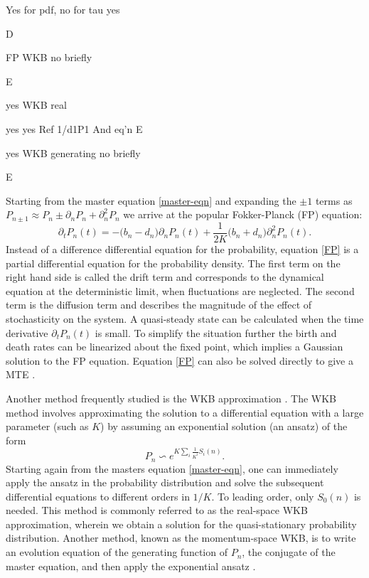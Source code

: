 Yes for pdf, no for tau
yes


D




FP WKB
no
briefly


E


yes
WKB real


yes
yes
Ref 1/d1P1
And eq’n
E


yes
WKB generating
no
briefly


E




\fi
Starting from the master equation \ref{master-eqn} and expanding the $\pm 1$ terms as $P_{n\pm 1} \approx P_n \pm \partial_n P_n + \partial^2_n P_n$ we arrive at the popular Fokker-Planck (FP) equation:
\begin{equation}
\partial_t P_n(t) = - \Big( b_n - d_n \Big) \partial_n P_n(t) + \frac{1}{2 K} \Big( b_n + d_n \Big) \partial_n^2 P_n(t).  \label{FP}
\end{equation}
Instead of a difference differential equation for the probability, equation \ref{FP} is a partial differential equation for the probability density.
The first term on the right hand side is called the drift term and corresponds to the dynamical equation at the deterministic limit, when fluctuations are neglected.
The second term is the diffusion term and describes the magnitude of the effect of stochasticity on the system.
A quasi-steady state can be calculated when the time derivative $\partial_t P_n(t)$ is small.
To simplify the situation further the birth and death rates can be linearized about the fixed point, which implies a Gaussian solution to the FP equation.
Equation \ref{FP} can also be solved directly to give a MTE \cite{Gardiner2004}.

Another method frequently studied is the WKB approximation \cite{Doering2005,Assaf2006,Kessler2007,Ovaskainen2010,Assaf2016}.
The WKB method involves approximating the solution to a differential equation with a large parameter (such as $K$) by assuming an exponential solution (an ansatz) of the form
\begin{equation}
P_n \backsim e^{K\sum_i \frac{1}{K^i}S_i(n)}.
\label{ansatz}
\end{equation}
Starting again from the masters equation \ref{master-eqn}, one can immediately apply the ansatz in the probability distribution and solve the subsequent differential equations to different orders in $1/K$\cite{Assaf2016}.%
To leading order, only $S_0(n)$ is needed.
This method is commonly referred to as the real-space WKB approximation, wherein we obtain a solution for the quasi-stationary probability distribution.
Another method, known as the momentum-space WKB, is to write an evolution equation of the generating function of $P_n$, the conjugate of the master equation, and then apply the exponential ansatz \cite{Assaf2006,Assaf2016}.


